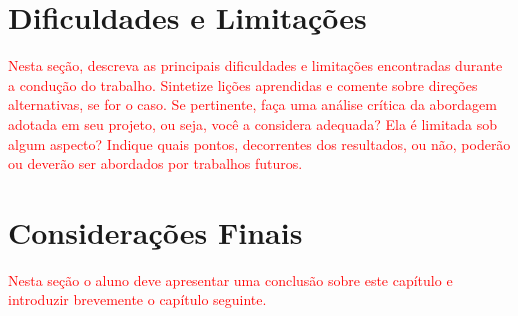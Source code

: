 \section{Dificuldades e Limitações}

\textcolor{red}{Nesta seção, descreva as principais dificuldades e limitações encontradas durante a condução do trabalho. Sintetize lições aprendidas e comente sobre direções alternativas, se for o caso. Se pertinente, faça uma análise crítica da abordagem adotada em seu projeto, ou seja, você a considera adequada? Ela é limitada sob algum aspecto? Indique quais pontos, decorrentes dos resultados, ou não, poderão ou deverão ser abordados por trabalhos futuros.}

\section{Considerações Finais}

\textcolor{red}{Nesta seção o aluno deve apresentar uma conclusão sobre este capítulo e introduzir brevemente o capítulo seguinte.}
